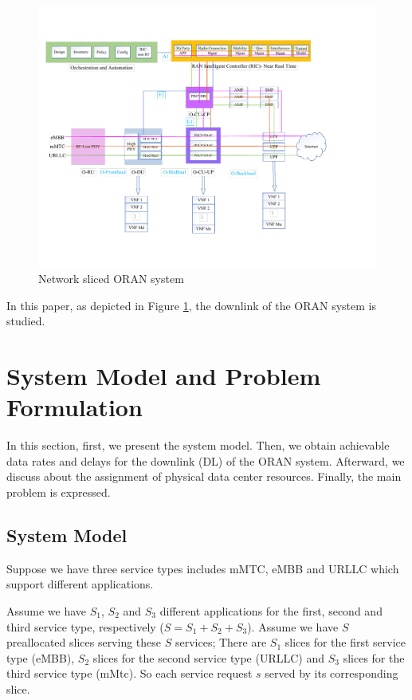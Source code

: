 \documentclass[conference]{IEEEtran}
\begin{document}
\begin{figure}
  \centering 
    \includegraphics[scale = 0.4]{Drawing13.pdf}
  \caption{Network sliced ORAN system}
  \label{fig:c11}
\end{figure}

In this paper, as  depicted in Figure \ref{fig:c11}, the downlink of the ORAN system is studied.
\section{System Model and Problem Formulation}\label{systemmodel}

In this section, first, we  present the system model. Then, we obtain achievable data rates and delays for the downlink (DL) of the ORAN system. Afterward, we discuss about the assignment of physical data center resources.
Finally, the main problem is expressed.
\subsection{System Model}
Suppose we have three service types includes mMTC, eMBB and URLLC which support different applications.

Assume we have $S_1$, $S_2$ and $S_3$ different applications for the first, second and third service type, respectively ($S = S_1 + S_2 + S_3$).
Assume we have $S$ preallocated slices serving these $S$ services; There are $S_1$ slices for the first service type (eMBB), $S_2$ slices for the second service type (URLLC) and $S_3$ slices for the third service type (mMtc). So each service request $s$ served by its corresponding slice.
\end{document}

